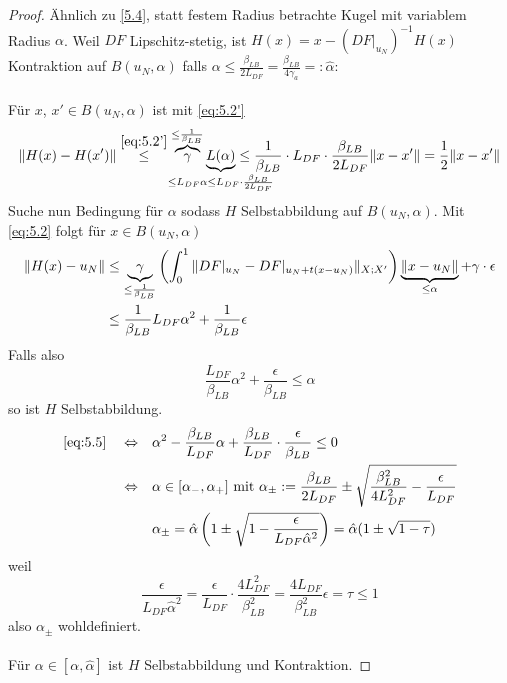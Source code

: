 \begin{proof}
	Ähnlich zu \ref{5.4}, statt festem Radius betrachte Kugel mit variablem Radius $\alpha$.
	Weil $DF$ Lipschitz-stetig, ist $H(x)= x-(DF|_{u_N})^{-1} H(x)$ Kontraktion auf $B(u_N,\alpha)$ falls $\alpha \leq \frac{\beta_{LB}}{2 L_{DF}} = \frac{\beta_{LB}}{4 \gamma_a} =: \hat\alpha$:\\ \\
	Für $x$, $x' \in B(u_N,\alpha)$ ist mit \eqref{eq:5.2'}
	\[
		\norm{H(x)-H(x')} \stackrel{\eqref{eq:5.2'}}{\leq} \overbrace{\gamma}^{\leq \frac{1}{\beta_{LB}}} \underbrace{L(\alpha)}_{\mathclap{\leq L_{DF} \alpha \leq L_{DF} \cdot \frac{\beta_{LB}}{2 L_{DF}}}} \leq \frac{1}{\beta_{LB}} \cdot L_{DF} \cdot \frac{\beta_{LB}}{2 L_{DF}} \norm{x-x'} = \frac{1}{2} \norm{x-x'}
	\]
	Suche nun Bedingung für $\alpha$ sodass $H$ Selbstabbildung auf $B(u_N,\alpha)$. Mit \eqref{eq:5.2} folgt für $x \in B(u_N,\alpha)$
	\begin{align*}
		\|H(x)-u_N\| &\leq \underbrace{\gamma}_{\leq \frac{1}{\beta_{LB}}} \left( \int_0^1 \|DF|_{u_N} - DF|_{u_N+t(x-u_N)}\|_{X;X'} \right) \underbrace{\|x-u_N\|}_{\leq \alpha} + \gamma \cdot \epsilon\\
		&\leq \frac{1}{\beta_{LB}} L_{DF} \alpha^2 + \frac{1}{\beta_{LB}} \epsilon
	\end{align*}
	Falls also
	\begin{equation} \label{eq:5.5}
		\frac{L_{DF}}{\beta_{LB}} \alpha^2 + \frac{\epsilon}{\beta_{LB}} \leq \alpha
	\end{equation}
	so ist $H$ Selbstabbildung.
	\begin{align*}
		\eqref{eq:5.5} \quad \Leftrightarrow \quad &\alpha^2 - \frac{\beta_{LB}}{L_{DF}} \alpha + \frac{\beta_{LB}}{L_{DF}} \cdot \frac{\epsilon}{\beta_{LB}} \leq 0\\
		\Leftrightarrow \quad &\alpha \in [\alpha_-,\alpha_+] \text{ mit } \alpha_\pm := \frac{\beta_{LB}}{2 L_{DF}} \pm \sqrt{\frac{\beta_{LB}^2}{4L_{DF}^2}-\frac{\epsilon}{L_{DF}}}\\
		&\alpha_\pm = \hat\alpha \left( 1 \pm \sqrt{1-\frac{\epsilon}{L_{DF} \hat\alpha^2}} \right) = \hat\alpha ( 1 \pm \sqrt{1-\tau})
	\end{align*}
	weil
	\[
		\frac{\epsilon}{L_{DF} \hat\alpha^2} = \frac{\epsilon}{L_{DF}} \cdot \frac{4 L_{DF}^2}{\beta_{LB}^2} = \frac{4 L_{DF}}{\beta_{LB}^2} \epsilon = \tau \leq 1
	\]
	also $\alpha_\pm$ wohldefiniert.\\
	\\
	Für $\alpha \in [\alpha,\hat\alpha]$ ist $H$ Selbstabbildung und Kontraktion.

\end{proof}
